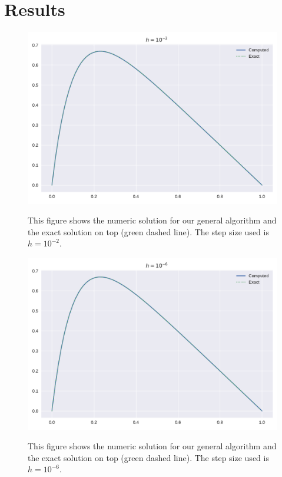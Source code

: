\documentclass[reprint, english,notitlepage]{revtex4-1}  %
\begin{document}
\section{Results}

\begin{figure}[h]
	\centering
	\includegraphics[scale=0.44]{../output/slow_2.pdf}
	\label{fig:slow_2}
	\caption{This figure shows the numeric solution for our general algorithm and the exact solution on top (green dashed line). The step size used is $h=10^{-2}$.}
\end{figure}

\begin{figure}[h]
	\centering
	\includegraphics[scale=0.44]{../output/slow_6.pdf}
	\label{fig:slow_6}
	\caption{This figure shows the numeric solution for our general algorithm and the exact solution on top (green dashed line). The step size used is $h=10^{-6}$.}
\end{figure}
\end{document}
